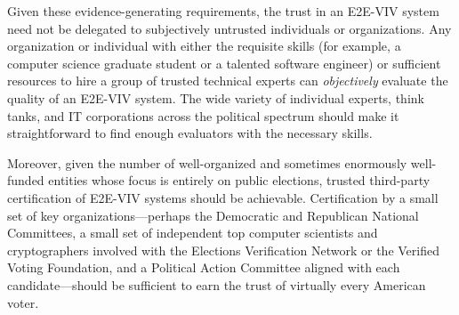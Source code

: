 Given these evidence-generating requirements, the trust in an E2E-VIV
system need not be delegated to subjectively untrusted individuals or
organizations. Any organization or individual with either the
requisite skills (for example, a computer science graduate student or
a talented software engineer) or sufficient resources to hire a group
of trusted technical experts can \emph{objectively} evaluate the
quality of an E2E-VIV system. The wide variety of individual experts,
think tanks, and IT corporations across the political spectrum should
make it straightforward to find enough evaluators with the necessary
skills.

Moreover, given the number of well-organized and sometimes enormously
well-funded entities whose focus is entirely on public elections,
trusted third-party certification of E2E-VIV systems should be
achievable. Certification by a small set of key
organizations---perhaps the Democratic and Republican National
Committees, a small set of independent top computer scientists and
cryptographers involved with the Elections Verification Network or the
Verified Voting Foundation, and a Political Action Committee aligned
with each candidate---should be sufficient to earn the trust of
virtually every American voter.

